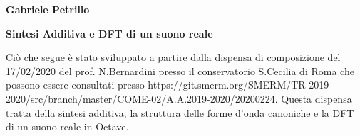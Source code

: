 \documentclass[11pt]{article}
\begin{document}
\begin{minipage}{0.55\linewidth}
\vspace{0.3cm}
{\large{\textbf{\textsf{Gabriele Petrillo}}}}\\\end{minipage}

\vspace{0.3cm}
\begin{minipage}{0.95\linewidth}
\begin{center}
{\huge{\textbf{\textsf{Sintesi Additiva e DFT di un suono reale}}}} \\
\end{center}
\end{minipage}
\vspace*{0.2cm}


\begin{center}
\begin{minipage}[c]{14cm}
\begin{textit}

Ciò che segue è stato sviluppato a partire dalla dispensa di composizione del 17/02/2020 del prof. N.Bernardini presso il conservatorio S.Cecilia di Roma che possono essere consultati presso https://git.smerm.org/SMERM/TR-2019-2020/src/branch/master/COME-02/A.A.2019-2020/20200224. Questa dispensa tratta della sintesi additiva, la struttura delle forme d'onda canoniche e la DFT di un suono reale in Octave.

\end{textit}
\end{minipage}
\end{center}
\vspace*{0.2cm}

\end{document}
